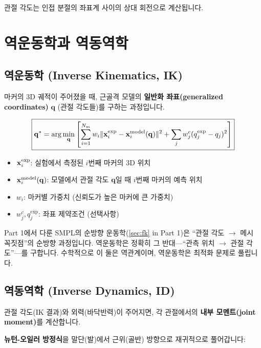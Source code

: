 \documentclass[11pt, a4paper]{report}
\begin{document}
관절 각도는 인접 분절의 좌표계 사이의 상대 회전으로 계산됩니다.


\section{역운동학과 역동역학}
\label{sec:ik_id}

\subsection{역운동학 (Inverse Kinematics, IK)}

마커의 3D 궤적이 주어졌을 때, 근골격 모델의 \textbf{일반화 좌표(generalized coordinates)} $\mathbf{q}$ (관절 각도들)를 구하는 과정입니다.

\begin{equation}
\boxed{
\mathbf{q}^* = \arg\min_{\mathbf{q}} \left[ \sum_{i=1}^{N_m} w_i \| \mathbf{x}_i^{\text{exp}} - \mathbf{x}_i^{\text{model}}(\mathbf{q}) \|^2 + \sum_{j} w_j^c (q_j^{\text{exp}} - q_j)^2 \right]
}
\label{eq:ik}
\end{equation}

\begin{itemize}[leftmargin=*]
  \item $\mathbf{x}_i^{\text{exp}}$: 실험에서 측정된 $i$번째 마커의 3D 위치
  \item $\mathbf{x}_i^{\text{model}}(\mathbf{q})$: 모델에서 관절 각도 $\mathbf{q}$일 때 $i$번째 마커의 예측 위치
  \item $w_i$: 마커별 가중치 (신뢰도가 높은 마커에 큰 가중치)
  \item $w_j^c, q_j^{\text{exp}}$: 좌표 제약조건 (선택사항)
\end{itemize}

\begin{remark}
Part 1에서 다룬 SMPL의 순방향 운동학(\cref{sec:fk} in Part 1)은 ``관절 각도 $\rightarrow$ 메시 꼭짓점''의 순방향 과정입니다. 역운동학은 정확히 그 반대---``관측 위치 $\rightarrow$ 관절 각도''---를 구합니다. 수학적으로 이 둘은 역관계이며, 역운동학은 최적화 문제로 풀립니다.
\end{remark}

\subsection{역동역학 (Inverse Dynamics, ID)}

관절 각도(IK 결과)와 외력(바닥반력)이 주어지면, 각 관절에서의 \textbf{내부 모멘트(joint moment)}를 계산합니다.

\textbf{뉴턴-오일러 방정식}을 말단(발)에서 근위(골반) 방향으로 재귀적으로 풀어갑니다:
\end{document}
